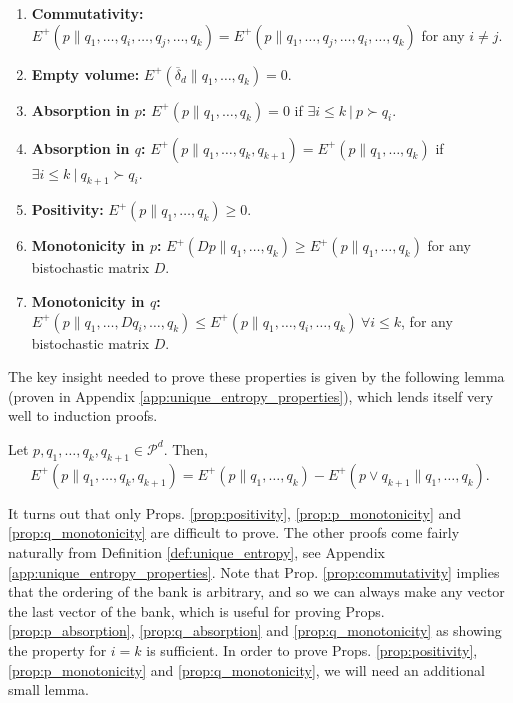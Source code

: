 \begin{enumerate}
    \item \textbf{Commutativity:} $E^+(p \parallel q_1, \dots, q_i, \dots, q_j, \dots, q_k) = E^+(p \parallel q_1, \dots, q_j, \dots, q_i, \dots, q_k)$ for any $i \neq j$. \label{prop:commutativity}
    \item \textbf{Empty volume:} $E^+(\overline{\delta}_d \parallel q_1, \dots, q_k) = 0$. \label{prop:empty}
    \item \textbf{Absorption in $p$:} $E^+(p \parallel q_1, \dots, q_k) = 0$ if $\exists i \leq k \: | \: p \succ q_i$. \label{prop:p_absorption}
    \item \textbf{Absorption in $q$:} $E^+(p \parallel q_1, \dots, q_k, q_{k+1}) = E^+(p \parallel q_1, \dots, q_k)$ if $\exists i \leq k \: | \: q_{k+1} \succ q_i$. \label{prop:q_absorption}
    \item \textbf{Positivity:} $E^+(p \parallel q_1, \dots, q_k) \geq 0$. \label{prop:positivity}
    \item \textbf{Monotonicity in $p$:} $E^+(Dp \parallel q_1, \dots, q_k) \geq E^+(p \parallel q_1, \dots, q_k)$ for any bistochastic matrix $D$. \label{prop:p_monotonicity}
    \item \textbf{Monotonicity in $q$:} $E^+(p \parallel q_1, \dots, Dq_i, \dots, q_k) \leq E^+(p \parallel q_1, \dots, q_i, \dots, q_k) \: \forall i \leq k$,  for any bistochastic matrix $D$. \label{prop:q_monotonicity}
\end{enumerate}

\noindent The key insight needed to prove these properties is given by the following lemma (proven in Appendix \ref{app:unique_entropy_properties}), which lends itself very well to induction proofs.

\begin{lemma} \label{lem:induction_trick}
    Let $p, q_1, \dots, q_k, q_{k+1} \in \mathcal{P}^d$. Then,
    \begin{equation}
        E^+(p \parallel q_1, \dots, q_k, q_{k+1}) = E^+(p \parallel q_1, \dots, q_k) - E^+(p \vee q_{k+1} \parallel q_1, \dots, q_k).
    \end{equation}
\end{lemma}

It turns out that only Props. \ref{prop:positivity}, \ref{prop:p_monotonicity} and \ref{prop:q_monotonicity} are difficult to prove. The other proofs come fairly naturally from Definition \ref{def:unique_entropy}, see Appendix \ref{app:unique_entropy_properties}. Note that Prop. \ref{prop:commutativity} implies that the ordering of the bank is arbitrary, and so we can always make any vector the last vector of the bank, which is useful for proving Props. \ref{prop:p_absorption}, \ref{prop:q_absorption} and \ref{prop:q_monotonicity} as showing the property for $i = k$ is sufficient. In order to prove Props. \ref{prop:positivity}, \ref{prop:p_monotonicity} and \ref{prop:q_monotonicity}, we will need an additional small lemma.

